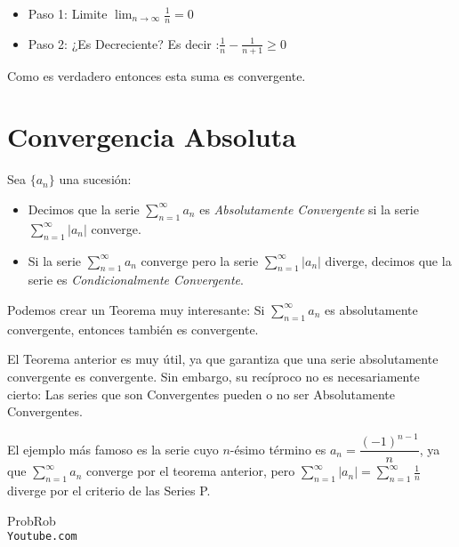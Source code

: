 \documentclass[12pt]{report}							    %
\begin{document}
     \begin{itemize}
        \item Paso 1: Limite $\lim_{n \to \infty} \frac{1}{n}=0$
        \item Paso 2: ¿Es Decreciente? Es decir :$\frac{1}{n}-\frac{1}{n+1} \geq 0 $
     \end{itemize}

    Como es verdadero entonces esta suma es convergente.





    \clearpage
    \section{Convergencia Absoluta}

    Sea $\{a_n\}$ una sucesión:

    \begin{itemize}
        \item Decimos que la serie $\sum_{n=1}^{\infty} a_n$ es \emph{Absolutamente Convergente} si la serie $\sum_{n=1}^{\infty} |a_n|$ converge.

        \item Si la serie $\sum_{n=1}^{\infty} a_n$ converge pero la serie $\sum_{n=1}^{\infty} |a_n|$ diverge, decimos que la serie es \emph{Condicionalmente Convergente}.
    \end{itemize}

    Podemos crear un Teorema muy interesante:
    Si $\sum_{n=1}^{\infty} a_n$ es absolutamente convergente, entonces también es convergente.

    El Teorema anterior es muy útil, ya que garantiza que una serie absolutamente convergente es convergente.
    Sin embargo, su recíproco no es necesariamente cierto: Las series que son Convergentes pueden o no ser Absolutamente Convergentes. 

    El ejemplo más famoso es la serie cuyo $n$-ésimo término es $a_n=\dfrac{(-1)^{n-1}}{n}$, ya que $\sum_{n=1}^{\infty}a_n$ converge por el teorema anterior, pero $\sum_{n=1}^{\infty} |a_n| = \sum_{n=1}^{\infty} \frac{1}{n}$ diverge por el criterio de las Series P.



\clearpage

	\begin{thebibliography}{9}

		ProbRob
		\\\texttt{Youtube.com}


	 

\end{thebibliography}
\end{document}
